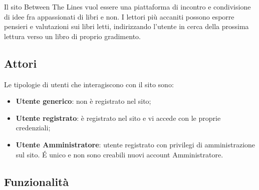 \documentclass[12pt,a4paper,headings=optiontohead]{article}
\begin{document}
	Il sito Between The Lines vuol essere una piattaforma di incontro e condivisione di idee fra appassionati di libri e non. I lettori più accaniti possono esporre pensieri e valutazioni sui libri letti, indirizzando l'utente in cerca della prossima lettura verso un libro di proprio gradimento.
	
	
	\subsection{Attori}
	
	Le tipologie di utenti che interagiscono con il sito sono:
	\begin{itemize}
		\item \textbf{Utente generico}: non è registrato nel sito;
		\item \textbf{Utente registrato}: è registrato nel sito e vi accede con le proprie credenziali;
		\item \textbf{Utente Amministratore}: utente registrato con privilegi di amministrazione sul sito. \'E unico e non sono creabili nuovi account Amministratore. 
	\end{itemize} 
	
	
	\subsection{Funzionalità}
	
\end{document}
